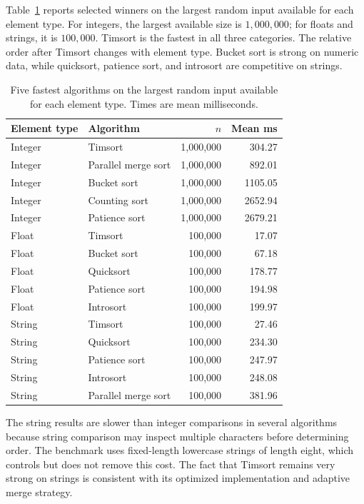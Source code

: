 \documentclass[11pt,a4paper]{article}
\begin{document}
Table~\ref{tab:selected-results} reports selected winners on the largest random input available for each element type. For integers, the largest available size is $1,000,000$; for floats and strings, it is $100,000$. Timsort is the fastest in all three categories. The relative order after Timsort changes with element type. Bucket sort is strong on numeric data, while quicksort, patience sort, and introsort are competitive on strings.

\begin{table}[H]
\centering
\caption{Five fastest algorithms on the largest random input available for each element type. Times are mean milliseconds.}
\label{tab:selected-results}
\small
\begin{tabular}{llrr}
\toprule
Element type & Algorithm & $n$ & Mean ms \\
\midrule
Integer & Timsort & 1,000,000 & 304.27 \\
Integer & Parallel merge sort & 1,000,000 & 892.01 \\
Integer & Bucket sort & 1,000,000 & 1105.05 \\
Integer & Counting sort & 1,000,000 & 2652.94 \\
Integer & Patience sort & 1,000,000 & 2679.21 \\
\midrule
Float & Timsort & 100,000 & 17.07 \\
Float & Bucket sort & 100,000 & 67.18 \\
Float & Quicksort & 100,000 & 178.77 \\
Float & Patience sort & 100,000 & 194.98 \\
Float & Introsort & 100,000 & 199.97 \\
\midrule
String & Timsort & 100,000 & 27.46 \\
String & Quicksort & 100,000 & 234.30 \\
String & Patience sort & 100,000 & 247.97 \\
String & Introsort & 100,000 & 248.08 \\
String & Parallel merge sort & 100,000 & 381.96 \\
\bottomrule
\end{tabular}
\end{table}

The string results are slower than integer comparisons in several algorithms because string comparison may inspect multiple characters before determining order. The benchmark uses fixed-length lowercase strings of length eight, which controls but does not remove this cost. The fact that Timsort remains very strong on strings is consistent with its optimized implementation and adaptive merge strategy.
\end{document}
